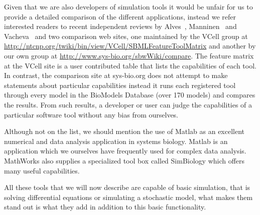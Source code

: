 \documentclass[12pt]{article}
\begin{document}
Given that we are also developers of simulation tools it would be
unfair for us to provide a detailed comparison of the different
applications, instead we refer interested readers to recent
independent reviews by Alves~\citep{Alves:2006},
Manninen~\citep{Manninen:2006} and Vacheva~\citep{VachevaE:2006} and
two comparison web sites, one maintained by the VCell group at
\url{http://ntcnp.org/twiki/bin/view/VCell/SBMLFeatureToolMatrix}
and another by our own group at
\url{http://www.sys-bio.org/sbwWiki/compare}. The feature matrix at
the VCell site is a user contributed table that lists the
capabilities of each tool. In contrast, the comparison site at
sys-bio.org does not attempt to make statements about particular
capabilities instead it runs each registered tool through every
model in the BioModels Database (over 170 models) and compares the
results. From such results, a developer or user can judge the
capabilities of a particular software tool without any bias from
ourselves.

Although not on the list, we should mention the use of Matlab as an
excellent numerical and data analysis application in systems
biology. Matlab is an application which we ourselves have frequently
used for complex data analysis. MathWorks also supplies a specialized
tool box called SimBiology which offers many useful capabilities.

All these tools that we will now describe are capable of basic
simulation, that is solving differential equations or simulating a
stochastic model, what makes them stand out is what they add in
addition to this basic functionality.


\end{document}
